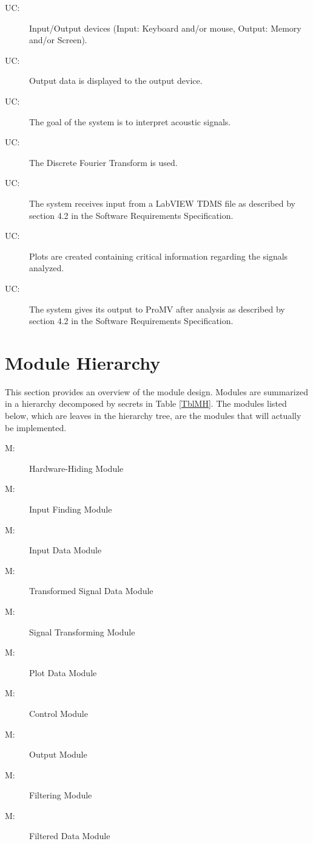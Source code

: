 \documentclass[12pt]{article}
\newcounter{ucnum}
\newcommand{\uctheucnum}{UC\theucnum}
\newcounter{mnum}
\newcommand{\mthemnum}{M\themnum}
\begin{document}
\begin{description}
\item[ \uctheucnum \label{ucIO}:] Input/Output devices
  (Input: Keyboard and/or mouse, Output: Memory and/or Screen).
\item[ \uctheucnum \label{ucOutput}:] Output data is
  displayed to the output device.
\item[ \uctheucnum \label{ucGoal}:] The goal of the system
  is to interpret acoustic signals.
\item[ \uctheucnum \label{ucDFT}:] The Discrete Fourier 
Transform is used.
\item[ \uctheucnum \label{ucInput}:] The system receives 
input from a LabVIEW TDMS file as described by section 4.2 in the Software
 Requirements Specification. 
\item[ \uctheucnum \label{ucPlot}:] Plots are created 
containing critical information regarding the signals analyzed.
\item[ \uctheucnum \label{ucProMV}:] The system gives 
its output to ProMV after analysis as described by section 4.2 in the Software
 Requirements Specification. 
\end{description}

\section{Module Hierarchy} \label{SecMH}

This section provides an overview of the module design. Modules are summarized
in a hierarchy decomposed by secrets in Table \ref{TblMH}. The modules listed
below, which are leaves in the hierarchy tree, are the modules that will
actually be implemented.

\begin{description}
\item [ \mthemnum \label{mHH}:] Hardware-Hiding Module
\item [ \mthemnum \label{mInput}:] Input Finding Module
\item [ \mthemnum \label{mInputData}:] Input Data Module
\item [ \mthemnum \label{mTransformInfo}:] Transformed 
Signal Data Module
\item [ \mthemnum \label{mTransform}:] Signal 
Transforming Module
\item [ \mthemnum \label{mPlotInfo}:] Plot Data Module
\item [ \mthemnum \label{mControl}:] Control Module
\item [ \mthemnum \label{mOutput}:] Output Module
\item [ \mthemnum \label{mFilter}:] Filtering Module
\item [ \mthemnum \label{mFilterInfo}:] Filtered Data
 Module
\end{description}
\end{document}
